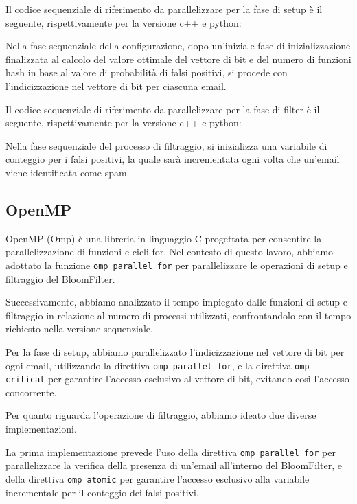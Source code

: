 Il codice sequenziale di riferimento da parallelizzare per la fase di setup è il seguente, rispettivamente per la versione c++ e python:



Nella fase sequenziale della configurazione, dopo un'iniziale fase di inizializzazione finalizzata al calcolo del valore
ottimale del vettore di bit e del numero di funzioni hash in base al valore di probabilità di falsi positivi,
si procede con l'indicizzazione nel vettore di bit per ciascuna email.

Il codice sequenziale di riferimento da parallelizzare per la fase di filter è il seguente, rispettivamente per la versione c++ e python:



Nella fase sequenziale del processo di filtraggio, si inizializza una variabile di conteggio per i
falsi positivi, la quale sarà incrementata ogni volta che un'email viene identificata come spam.

\subsection{OpenMP}\label{subsec:omp}
OpenMP (Omp) è una libreria in linguaggio C progettata per consentire la parallelizzazione di funzioni e cicli for.
Nel contesto di questo lavoro, abbiamo adottato la funzione \texttt{omp parallel for} per parallelizzare le operazioni
di setup e filtraggio del BloomFilter.

Successivamente, abbiamo analizzato il tempo impiegato dalle funzioni di setup e filtraggio in relazione al numero
di processi utilizzati, confrontandolo con il tempo richiesto nella versione sequenziale.

Per la fase di setup, abbiamo parallelizzato l'indicizzazione nel vettore di bit per ogni email, utilizzando la direttiva \texttt{omp parallel for},
e la direttiva \texttt{omp critical} per garantire l'accesso esclusivo al vettore di bit, evitando così l'accesso concorrente.

Per quanto riguarda l'operazione di filtraggio, abbiamo ideato due diverse implementazioni.

La prima implementazione prevede l'uso della direttiva \texttt{omp parallel for} per parallelizzare la verifica
della presenza di un'email all'interno del BloomFilter, e della direttiva \texttt{omp atomic} per garantire l'accesso esclusivo
alla variabile incrementale per il conteggio dei falsi positivi.

